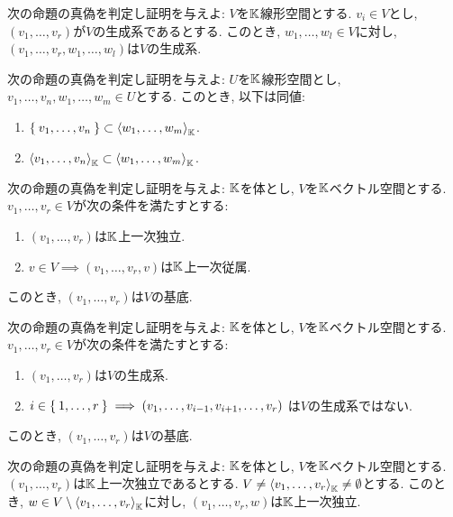\begin{quiz}
  次の命題の真偽を判定し証明を与えよ:
  $V$を$\mathbb{K}$線形空間とする.
  $v_i\in V$とし,
  $(v_1,\ldots, v_r)$が$V$の生成系であるとする.
  このとき,
  $w_1,\ldots,w_l\in V$に対し,
  $(v_{1},\ldots, v_{r},w_1,\ldots,w_l)$は$V$の生成系.
\end{quiz}

\begin{quiz}
  次の命題の真偽を判定し証明を与えよ:
  $U$を$\mathbb{K}$線形空間とし,
  $v_1,\ldots,v_n,w_1,\ldots,w_m \in U$とする.
  このとき, 以下は同値:  
  \begin{enumerate}
  \item $\Set{v_1,\ldots,v_n}\subset \Braket{w_1,\ldots,w_m}_{\mathbb{K}}$.
  \item $\Braket{v_1,\ldots,v_n}_{\mathbb{K}}\subset \Braket{w_1,\ldots,w_m}_{\mathbb{K}}$.
  \end{enumerate}
\end{quiz}



\begin{quiz}
  次の命題の真偽を判定し証明を与えよ:
  $\mathbb{K}$を体とし,
  $V$を$\mathbb{K}$ベクトル空間とする.
  $v_1,\ldots, v_r\in V$が次の条件を満たすとする:
  \begin{enumerate}
  \item $(v_1,\ldots, v_r)$は$\mathbb{K}$上一次独立.
  \item $v\in V\implies (v_1,\ldots, v_r,v)$は$\mathbb{K}$上一次従属.
  \end{enumerate}
  このとき,
  $(v_1,\ldots, v_r)$は$V$の基底.
\end{quiz}


\begin{quiz}
  次の命題の真偽を判定し証明を与えよ:
  $\mathbb{K}$を体とし,
  $V$を$\mathbb{K}$ベクトル空間とする.
  $v_1,\ldots, v_r\in V$が次の条件を満たすとする:
  \begin{enumerate}
  \item $(v_1,\ldots, v_r)$は$V$の生成系.
  \item
    $i\in \Set{1,\ldots,r}\implies (v_1,\ldots, v_{i-1},v_{i+1},\ldots,v_r)$
    は$V$の生成系ではない.
  \end{enumerate}
  このとき,
  $(v_1,\ldots, v_r)$は$V$の基底.
\end{quiz}

\begin{quiz}
  次の命題の真偽を判定し証明を与えよ:
$\mathbb{K}$を体とし,
  $V$を$\mathbb{K}$ベクトル空間とする.
  $(v_1,\ldots, v_r)$は$\mathbb{K}$上一次独立であるとする.
  $V\neq\Braket{v_1,\ldots, v_r}_{\mathbb{K}}\neq \emptyset$とする.
  このとき, $w\in V\setminus\Braket{v_1,\ldots, v_r}_{\mathbb{K}}$に対し,
  $(v_1,\ldots,v_{r},w)$は$\mathbb{K}$上一次独立.
\end{quiz}

